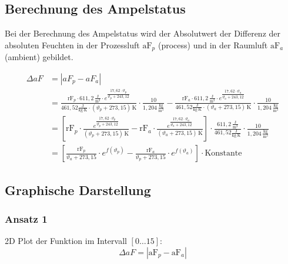 
\subsection{Berechnung des Ampelstatus}
Bei der Berechnung des Ampelstatus wird der Absolutwert der Differenz der absoluten Feuchten in der Prozessluft $\text{aF}_p$ (process) und in der Raumluft $\text{aF}_a$ (ambient) gebildet.

\begin{align}
    \Delta aF
    &=  \left| aF_p - aF_a \right| 
    \\[4ex]
    &=
    \frac{\text{rF}_p \cdot 611{,}2\, \frac{\text{J}}{\text{m}^3} \cdot e^{\dfrac{17{,}62 \cdot \vartheta_p}{\vartheta_p + 243{,}12}}}
    {461{,}52 \frac{\text{J}}{\text{kg} \cdot \text{K}} \cdot (\vartheta_p + 273{,}15)\, \text{K}}
    \cdot \frac{10}{1{,}204\, \frac{\text{kg}}{\text{m}^3}}
    - 
    \frac{\text{rF}_a \cdot 611{,}2\, \frac{\text{J}}{\text{m}^3} \cdot e^{\dfrac{17{,}62 \cdot \vartheta_a}{\vartheta_a + 243{,}12}}}
    {461{,}52 \frac{\text{J}}{\text{kg} \cdot \text{K}} \cdot (\vartheta_a + 273{,}15)\, \text{K}}
    \cdot \frac{10}{1{,}204\, \frac{\text{kg}}{\text{m}^3}}
    \\[4ex]
    &=
    \left[
    \text{rF}_p  \cdot
    \frac{ e^{\dfrac{17{,}62 \cdot \vartheta_p}{\vartheta_p + 243{,}12}}}
    { (\vartheta_p + 273{,}15)\, \text{K}}
    - 
    \text{rF}_a \cdot
    \frac{ e^{\dfrac{17{,}62 \cdot \vartheta_a}{\vartheta_a + 243{,}12}}}
    {(\vartheta_a + 273{,}15)\, \text{K}}
    \right]
    \cdot \frac{611{,}2\, \frac{\text{J}}{\text{m}^3}}{461{,}52 \frac{\text{J}}{\text{kg} \cdot \text{K}}}
    \cdot \frac{10}{1{,}204\, \frac{\text{kg}}{\text{m}^3}}
    \\[4ex]
     &=
    \left[
    \frac{\text{rF}_p}{\vartheta_a + 273{,}15} \cdot
    e^{f(\vartheta_p)}
    -
    \frac{\text{rF}_a}{\vartheta_p + 273{,}15} \cdot
    e^{f(\vartheta_a)}
    \right]
    \cdot \text{Konstante}   
\end{align}

\subsection{Graphische Darstellung}
\subsubsection{Ansatz 1}
2D Plot der Funktion im Intervall $[0 \dots 15]$:
\begin{equation}
    \Delta aF
    =  \left| \text{aF}_p - \text{aF}_a \right|     
\end{equation}

